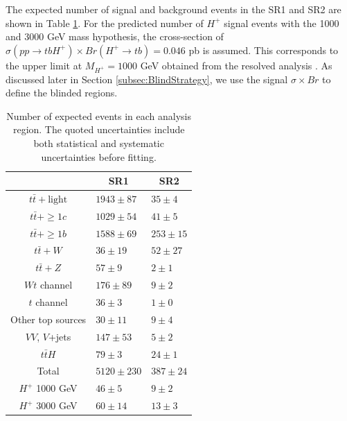 The expected number of signal and background events in the SR1 and SR2 are shown in Table \ref{tab:PrefitYields}. For the predicted number of $H^{+}$ signal events with the 1000 and 3000 GeV mass hypothesis, the cross-section of ${\sigma}(pp{\rightarrow}tbH^{+}){\times}Br(H^{+}{\rightarrow}tb)=0.046$ pb is assumed. This corresponds to the upper limit at $M_{H^{+}}=1000$ GeV obtained from the resolved analysis \cite{HDBS-2021-02}. As discussed later in Section \ref{subsec:BlindStrategy}, we use the signal ${\sigma}{\times}Br$ to define the blinded regions.

\begin{table}[H]
  \centering
  \begin{tabular*}{120mm}{@{\extracolsep{\fill}}cll}
    \hline\hline
                            & \multicolumn{1}{c}{SR1} & \multicolumn{1}{c}{SR2}\\
    \hline
    $t\bar{t}+\text{light}$ & $1943\pm 87$           & $   35\pm  4$ \\
    $t\bar{t}+\geq1c$       & $1029\pm 54$           & $   41\pm  5$ \\
    $t\bar{t}+\geq1b$       & $1588\pm 69$           & $  253\pm 15$ \\
    $t\bar{t}+W$            & $  36\pm 19$           & $   52\pm 27$ \\
    $t\bar{t}+Z$            & $  57\pm  9$           & $    2\pm  1$ \\
    $Wt$ channel            & $ 176\pm 89$           & $    9\pm  2$ \\
    $t$ channel             & $  36\pm  3$           & $    1\pm  0$ \\
    Other top sources       & $  30\pm 11$           & $    9\pm  4$ \\
    $VV$, $V$+jets          & $ 147\pm 53$           & $    5\pm  2$ \\
    $t\bar{t}H$             & $  79\pm  3$           & $   24\pm  1$ \\
    \hline
    Total                   & $5120\pm230$           & $  387\pm 24$ \\
    \hline
    $H^{+}$ 1000 GeV        & $  46\pm  5$           & $    9\pm  2$ \\
    $H^{+}$ 3000 GeV        & $  60\pm 14$           & $   13\pm  3$ \\
    \hline\hline
  \end{tabular*}
  \caption{Number of expected events in each analysis region. The quoted uncertainties include both statistical and systematic uncertainties before fitting.}
  \label{tab:PrefitYields}
\end{table}

